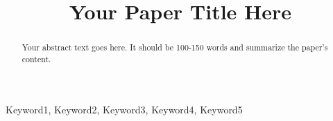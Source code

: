 \documentclass[conference]{IEEEtran}
\title{Your Paper Title Here}
\author{
    \IEEEauthorblockN{Author Name}
    \IEEEauthorblockA{Affiliation\\
    Email: email@example.com}
    \and
    \IEEEauthorblockN{Second Author Name}
    \IEEEauthorblockA{Affiliation\\
    Email: email2@example.com}
}
\begin{document}
\maketitle
\begin{abstract}
    Your abstract text goes here. It should be 100-150 words and summarize the paper's content.
\end{abstract}

\begin{IEEEkeywords}
    Keyword1, Keyword2, Keyword3, Keyword4, Keyword5
\end{IEEEkeywords}









\end{document}

